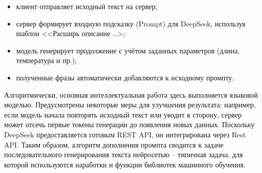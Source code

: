 \begin{itemize}
    \item клиент отправляет исходный текст на сервер;
    \item сервер формирует входную подсказку (Prompt) для DeepSeek, используя шаблон <<Расширь описание \dots>;
    \item модель генерирует продолжение с учётом заданных параметров (длина, температура и пр.);
    \item полученные фразы автоматически добавляются к исходному промпту.

\end{itemize}

Алгоритмически, основная интеллектуальная работа здесь выполняется языковой моделью. Предусмотрены некоторые меры для улучшения результата: например, если модель начала повторять исходный текст или уводит в сторону, сервер может отсечь первые токены генерации до появления новых данных. Поскольку DeepSeek предоставляется готовым REST API, он интегрирована через Rest API.  Таким образом, алгоритм дополнения промпта сводится к задаче последовательного генерирования текста нейросетью – типичная задача, для которой используются наработки и функции библиотек машинного обучения.

